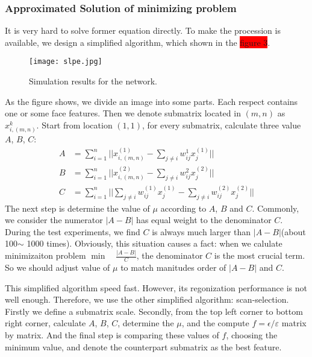 \documentclass[10pt,journal,final,twocolumn,]{IEEEtran}
\begin{document}
	
	
	\subsubsection{Approximated Solution of minimizing problem}
	It is very hard to solve former equation directly. To make the procession is available, we design a simplified algorithm, which shown in the {\colorbox{red}{figure 3}}.  
	\begin{figure}[!t]
		\centering
		\texttt{[image: slpe.jpg]}
		\caption{Simulation results for the network.}
		\label{fig 3}
	\end{figure}
	As the figure shows, we divide an image into some parts. Each respect contains one or some face features. Then we denote submatrix located in $(m,n)$ as $x_{i,(m,n)}^{k}$. Start from location $(1,1)$, for every submatrix, calculate three value $A$, $B$, $C$:
	\begin{align}
	A&=\sum_{i=1}^{n} ||x_{i,(m,n)}^{(1)} - \sum_{j \neq i} w_{ij}^{1} x_{j}^{(1)}|| \\
	B&=\sum_{i=1}^{n} ||x_{i,(m,n)}^{(2)} - \sum_{j \neq i} w_{ij}^{2} x_{j}^{(2)}|| \\
	C&=\sum_{i=1}^{n} ||\sum_{j \neq i} w_{ij}^{(1)}x_{j}^{(1)}-\sum_{j \neq i} w_{ij}^{(2)}x_{j}^{(2)}||
	\end{align}
	The next step is determine the value of $\mu$ according to $A$, $B$ and $C$. Commonly, we consider the numerator $|A-B|$ has equal weight to the denominator $C$. During the test experiments, we find $C$ is always much larger than $|A-B|$(about 100$\sim$ 1000 times). Obviously, this situation causes a fact: when we calulate minimizaiton problem $\min \quad \frac{|A-B|}{C}$, the denominator $C$ is the most crucial term. So we should adjust value of $\mu$ to match manitudes order of $|A-B|$ and $C$.
	
	This simplified algorithm speed fast. However, its regonization performance is not well enough. Therefore, we use the other simplified algorithm: scan-selection. Firstly we define a submatrix scale. Secondly, from the top left corner to bottom right corner, calculate $A$, $B$, $C$, determine the $\mu$, and the compute $f=\epsilon /\varepsilon$ matrix by matrix. And the final step is comparing these values of $f$, choosing the minimum value, and denote the counterpart submatrix as the best feature.
	
\end{document}
